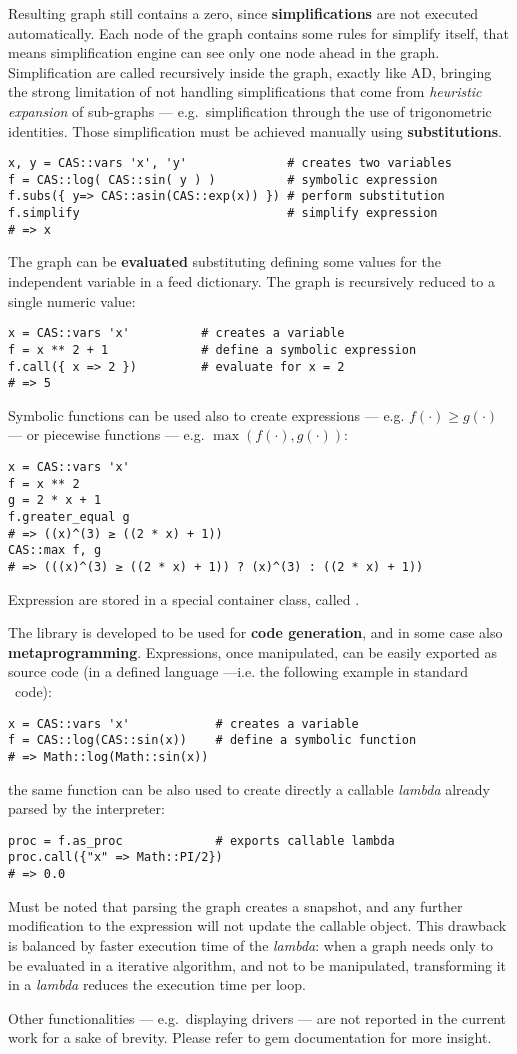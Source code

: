 Resulting graph still contains a zero, since \textbf{simplifications} are not executed automatically. Each node of the graph contains some rules for simplify itself, that means simplification engine can see only one node ahead in the graph. Simplification are called recursively inside the graph, exactly like AD, bringing the strong limitation of not handling simplifications that come from \emph{heuristic expansion} of sub-graphs --- e.g.\ simplification through the use of trigonometric identities. Those simplification must be achieved manually using \textbf{substitutions}.
\begin{lstlisting}
x, y = CAS::vars 'x', 'y'              # creates two variables
f = CAS::log( CAS::sin( y ) )          # symbolic expression
f.subs({ y=> CAS::asin(CAS::exp(x)) }) # perform substitution
f.simplify                             # simplify expression
# => x
\end{lstlisting}

The graph can be \textbf{evaluated} substituting defining some values for the independent variable in a feed dictionary. The graph is recursively reduced to a single numeric value:
\begin{lstlisting}
x = CAS::vars 'x'          # creates a variable
f = x ** 2 + 1             # define a symbolic expression
f.call({ x => 2 })         # evaluate for x = 2
# => 5
\end{lstlisting}

Symbolic functions can be used also to create expressions --- e.g. $f(\cdot) \geq g(\cdot)$ --- or piecewise functions --- e.g. $\max(f(\cdot), g(\cdot))$:
\begin{lstlisting}
x = CAS::vars 'x'
f = x ** 2
g = 2 * x + 1
f.greater_equal g
# => ((x)^(3) ≥ ((2 * x) + 1))
CAS::max f, g
# => (((x)^(3) ≥ ((2 * x) + 1)) ? (x)^(3) : ((2 * x) + 1))
\end{lstlisting}
Expression are stored in a special container class, called \CASExpression.

The library is developed to be used for \textbf{code generation}, and in some case also \textbf{meta\-programming}. Expressions, once manipulated, can be easily exported as source code (in a defined language ---i.e. the following example in standard \Ruby~code):
\begin{lstlisting}
x = CAS::vars 'x'            # creates a variable
f = CAS::log(CAS::sin(x))    # define a symbolic function
# => Math::log(Math::sin(x))
\end{lstlisting}
the same function can be also used to create directly a callable \emph{lambda} already parsed by the interpreter:
\begin{lstlisting}
proc = f.as_proc             # exports callable lambda
proc.call({"x" => Math::PI/2})
# => 0.0
\end{lstlisting}
Must be noted that parsing the graph creates a snapshot, and any further modification to the expression will not update the callable object. This drawback is balanced by faster execution time of the \emph{lambda}: when a graph needs only to be evaluated in a iterative algorithm, and not to be manipulated, transforming it in a \emph{lambda} reduces the execution time per loop.

Other functionalities --- e.g.\ displaying drivers --- are not reported in the current work for a sake of brevity. Please refer to gem documentation for more insight.
